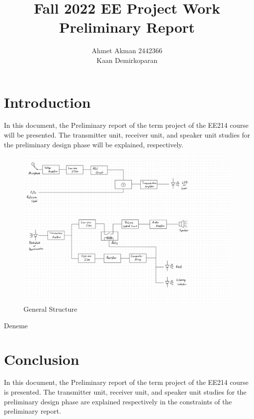 \documentclass[a4paper,10pt]{report}
\begin{document}
\thispagestyle{empty}

\title{ \vspace{-2cm} Fall 2022 EE Project Work  \protect\\ Preliminary Report\vspace{-4mm}}
\author{ Ahmet Akman 2442366 \protect\\ Kaan Demirkoparan}
\date{}
\maketitle
\vspace{-1.5cm}
\section{Introduction}
\vspace{-4mm}
In this document, the Preliminary report of the term project of the EE214 course will be presented. The transmitter unit, receiver unit, and speaker unit studies for the preliminary design phase will be explained, respectively.
\begin{figure}[H]
    \centering
    \includegraphics[width = 1\textwidth]{general_structure.jpeg}
    \caption{General Structure}
\end{figure} 
Deneme
\section{Conclusion}
In this document, the Preliminary report of the term project of the EE214 course is presented. The transmitter unit, receiver unit, and speaker unit studies for the preliminary design phase are explained respectively in the constraints of the preliminary report.
\end{document}
